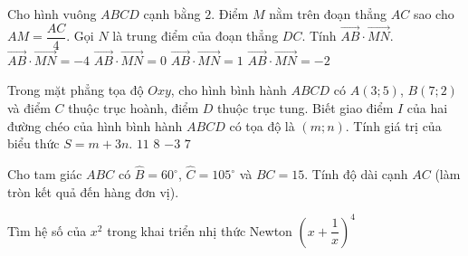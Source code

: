 \begin{ex}
	Cho hình vuông $ABCD$ cạnh bằng $2$. Điểm $M$ nằm trên đoạn thẳng $AC$ sao cho $AM=\dfrac{AC}{4}$. Gọi $N$ là trung điểm của đoạn thẳng $DC$. Tính $\vec{AB} \cdot \vec{MN}$.
	\choice
	{$\vec{AB} \cdot \vec{MN}=-4$}
	{$\vec{AB} \cdot \vec{MN}=0$}
	{\True $\vec{AB} \cdot \vec{MN}=1$}
	{$\vec{AB} \cdot \vec{MN}=-2$}
\end{ex}

\begin{ex}%
	Trong mặt phẳng tọa độ $Oxy$, cho hình bình hành $ABCD$ có $A(3;5)$, $B(7;2)$ và điểm $C$ thuộc trục hoành, điểm $D$ thuộc trục tung. Biết giao điểm $I$ của hai đường chéo của hình bình hành $ABCD$ có tọa độ là $(m; n)$. Tính giá trị của biểu thức $S=m+3n$.
	\choice
	{\True $11$}
	{$8$}
	{$-3$}
	{$7$}
\end{ex}

\TL
\begin{ex}%
	Cho tam giác $ABC$ có $\widehat{B}=60^\circ$, $\widehat{C}=105^\circ$ và $BC=15$. Tính độ dài cạnh $AC$ (làm tròn kết quả đến hàng đơn vị).
\end{ex}

\begin{ex}
	Tìm hệ số của $x^2$ trong khai triển nhị thức Newton $(x+\dfrac{1}{x})^4$
\end{ex}

